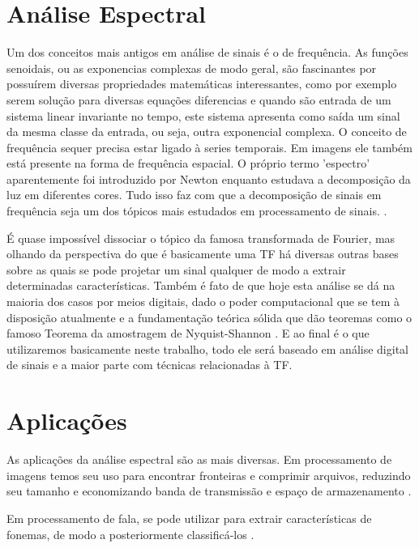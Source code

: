 
\section{Análise Espectral}

Um dos conceitos mais antigos em análise de sinais é o de frequência. As funções senoidais, ou as exponencias complexas de modo geral, são fascinantes por possuírem diversas propriedades matemáticas interessantes, como por exemplo serem solução para diversas equações diferencias e quando são entrada de um sistema linear invariante no tempo, este sistema apresenta como saída um sinal da mesma classe da entrada, ou seja, outra exponencial complexa. O conceito de frequência sequer precisa estar ligado à series temporais. Em imagens ele também está presente na forma de frequência espacial. O próprio termo 'espectro' aparentemente foi introduzido por Newton enquanto estudava a decomposição da luz em diferentes cores. Tudo isso faz com que a decomposição de sinais em frequência seja um dos tópicos mais estudados em processamento de sinais. \cite{stoica2005spectral} \cite{castanie2013digital}.

É quase impossível dissociar o tópico da famosa transformada de Fourier, mas olhando da perspectiva do que é basicamente uma TF há diversas outras bases sobre as quais se pode projetar um sinal qualquer de modo a extrair determinadas características. Também é fato de que hoje esta análise se dá na maioria dos casos por meios digitais, dado o poder computacional que se tem à disposição atualmente e a fundamentação teórica sólida que dão teoremas como o famoso Teorema da amostragem de Nyquist-Shannon \cite{mitra2006digital} \cite{lago2002digital}. E ao final é o que utilizaremos basicamente neste trabalho, todo ele será baseado em análise digital de sinais e a maior parte com técnicas relacionadas à TF.

\section{Aplicações}

As aplicações da análise espectral são as mais diversas. Em processamento de imagens temos seu uso para encontrar fronteiras e comprimir arquivos, reduzindo seu tamanho e economizando banda de transmissão e espaço de armazenamento \cite{baxes1994digital}. 

Em processamento de fala, se pode utilizar para extrair características de fonemas, de modo a posteriormente classificá-los \cite{huang2001spoken}.

